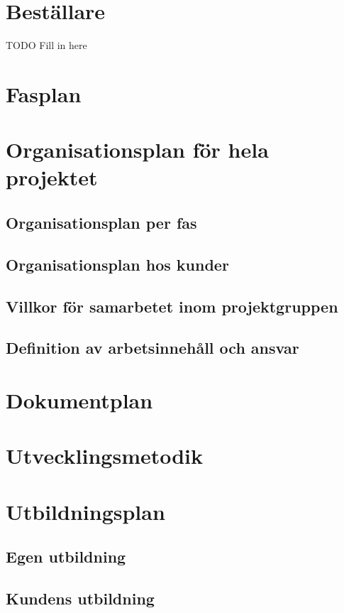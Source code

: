 \documentclass[projektplan/plan.tex]{subfiles}
\begin{document}
\section{Beställare}
TODO Fill in here


\section{Fasplan}

\section{Organisationsplan för hela projektet}
\subsection{Organisationsplan per fas}
\subsection{Organisationsplan hos kunder}
\subsection{Villkor för samarbetet inom projektgruppen}
\subsection{Definition av arbetsinnehåll och ansvar}

\section{Dokumentplan}

\section{Utvecklingsmetodik}


\section{Utbildningsplan}
\subsection{Egen utbildning}
\subsection{Kundens utbildning}
\end{document}
